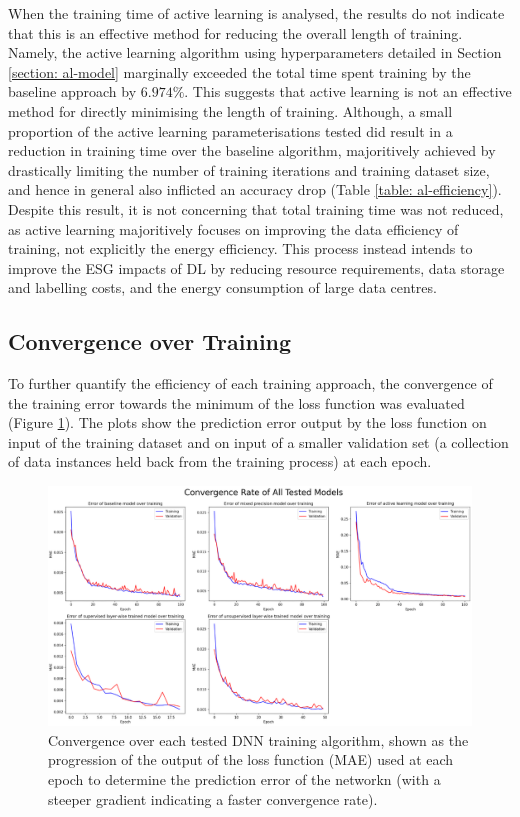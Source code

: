 \documentclass[a4paper, 11pt]{report}
\begin{document}
    When the training time of active learning is analysed, the results do not indicate that this is an effective method for reducing the overall length of training. Namely, the active learning algorithm using hyperparameters detailed in Section \ref{section: al-model} marginally exceeded the total time spent training by the baseline approach by $6.974\%$. This suggests that active learning is not an effective method for directly minimising the length of training. Although, a small proportion of the active learning parameterisations tested did result in a reduction in training time over the baseline algorithm, majoritively achieved by drastically limiting the number of training iterations and training dataset size, and hence in general also inflicted an accuracy drop (Table \ref{table: al-efficiency}). Despite this result, it is not concerning that total training time was not reduced, as active learning majoritively focuses on improving the data efficiency of training, not explicitly the energy efficiency. This process instead intends to improve the ESG impacts of DL by reducing resource requirements, data storage and labelling costs, and the energy consumption of large data centres.


    \subsection{Convergence over Training}

    To further quantify the efficiency of each training approach, the convergence of the training error towards the minimum of the loss function was evaluated (Figure \ref{fig: convergence}). The plots show the prediction error output by the loss function on input of the training dataset and on input of a smaller validation set (a collection of data instances held back from the training process) at each epoch.


    \begin{figure}[ht!]
        \centering
        \includegraphics[width=\textwidth]{results/all-training-loss.png}
        \caption{\centering Convergence over each tested DNN training algorithm, shown as the progression of the output of the loss function (MAE) used at each epoch to determine the prediction error of the networkn (with a steeper gradient indicating a faster convergence rate).}
        \label{fig: convergence}
    \end{figure}
\end{document}
